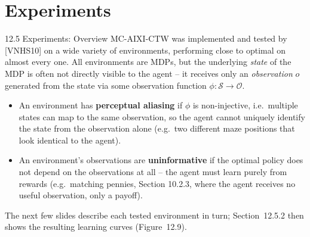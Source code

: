 \documentclass[aspectratio=169,10pt]{beamer}
\newcommand{\Ocal}{\mathcal{O}}
\newcommand{\Scal}{\mathcal{S}}
\begin{document}
\section{Experiments}

\begin{frame}{12.5 Experiments: Overview}
MC-AIXI-CTW was implemented and tested by [VNHS10] on a wide variety of environments,
performing close to optimal on almost every one. All environments are MDPs, but the
underlying \emph{state} of the MDP is often not directly visible to the agent -- it
receives only an \emph{observation} $o$ generated from the state via some observation
function $\phi:\Scal\to\Ocal$.
\begin{itemize}
\item An environment has \textbf{perceptual aliasing} if $\phi$ is non-injective, i.e.\
multiple states can map to the same observation, so the agent cannot uniquely identify
the state from the observation alone (e.g.\ two different maze positions that look
identical to the agent).
\item An environment's observations are \textbf{uninformative} if the optimal policy does
not depend on the observations at all -- the agent must learn purely from rewards (e.g.\
matching pennies, Section 10.2.3, where the agent receives no useful observation, only a
payoff).
\end{itemize}
The next few slides describe each tested environment in turn; Section~12.5.2 then shows
the resulting learning curves (Figure~12.9).
\end{frame}
\end{document}
